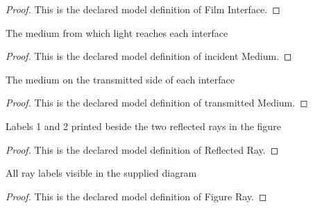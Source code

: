 \begin{proof}
  This is the declared model definition of Film Interface.
\end{proof}
\begin{definition}
  \label{def:physics:phyx-mini-0128:phyxminiproblems-problemphyxmini0128-filminterface-incidentmedium}
  The medium from which light reaches each interface
\end{definition}
\begin{proof}
  This is the declared model definition of incident Medium.
\end{proof}
\begin{definition}
  \label{def:physics:phyx-mini-0128:phyxminiproblems-problemphyxmini0128-filminterface-transmittedmedium}
  The medium on the transmitted side of each interface
\end{definition}
\begin{proof}
  This is the declared model definition of transmitted Medium.
\end{proof}
\begin{definition}
  \label{def:physics:phyx-mini-0128:phyxminiproblems-problemphyxmini0128-reflectedray}
  Labels 1 and 2 printed beside the two reflected rays in the figure
\end{definition}
\begin{proof}
  This is the declared model definition of Reflected Ray.
\end{proof}
\begin{definition}
  \label{def:physics:phyx-mini-0128:phyxminiproblems-problemphyxmini0128-figureray}
  All ray labels visible in the supplied diagram
\end{definition}
\begin{proof}
  This is the declared model definition of Figure Ray.
\end{proof}
